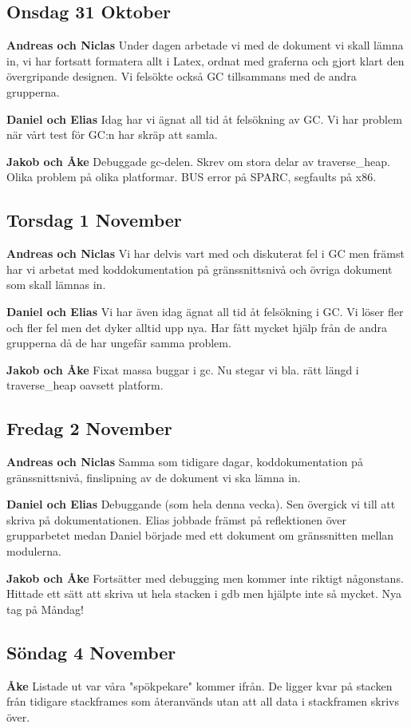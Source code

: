 \documentclass{article}
\begin{document}
\subsection{Onsdag 31 Oktober}
{\bf Andreas och Niclas}
Under dagen arbetade vi med de dokument vi skall lämna in, vi har fortsatt formatera allt i Latex, ordnat med graferna och gjort klart den övergripande designen. Vi felsökte också GC tillsammans med de andra grupperna.

{\bf Daniel och Elias}
Idag har vi ägnat all tid åt felsökning av GC. Vi har problem när vårt test för GC:n har skräp att samla.

{\bf Jakob och Åke}
Debuggade gc-delen. Skrev om stora delar av traverse\_heap. Olika problem på olika platformar. BUS error på SPARC, segfaults på x86.

\subsection{Torsdag 1 November}
{\bf Andreas och Niclas} Vi har delvis vart med och diskuterat fel i GC men främst har vi arbetat med koddokumentation på gränssnittsnivå och övriga dokument som skall lämnas in.

{\bf Daniel och Elias} Vi har även idag ägnat all tid åt felsökning i GC. Vi löser fler och fler fel men det dyker alltid upp nya. Har fått mycket hjälp från de andra grupperna då de har ungefär samma problem.

{\bf Jakob och Åke} Fixat massa buggar i gc. Nu stegar vi bla. rätt längd i traverse\_heap oavsett platform.

\subsection{Fredag 2 November}
{\bf Andreas och Niclas} Samma som tidigare dagar, koddokumentation på gränssnittsnivå, finslipning av de dokument vi ska lämna in.

{\bf Daniel och Elias} Debuggande (som hela denna vecka). Sen övergick vi till att skriva på dokumentationen. Elias jobbade främst på reflektionen över grupparbetet medan Daniel började med ett dokument om gränssnitten mellan modulerna.

{\bf Jakob och Åke} Fortsätter med debugging men kommer inte riktigt någonstans. Hittade ett sätt att skriva ut hela stacken i gdb men hjälpte inte så mycket. Nya tag på Måndag!

\subsection{Söndag 4 November}
{\bf Åke} Listade ut var våra "spökpekare" kommer ifrån. De ligger kvar på stacken från tidigare stackframes som återanvänds utan att all data i stackframen skrivs över.
\end{document}
